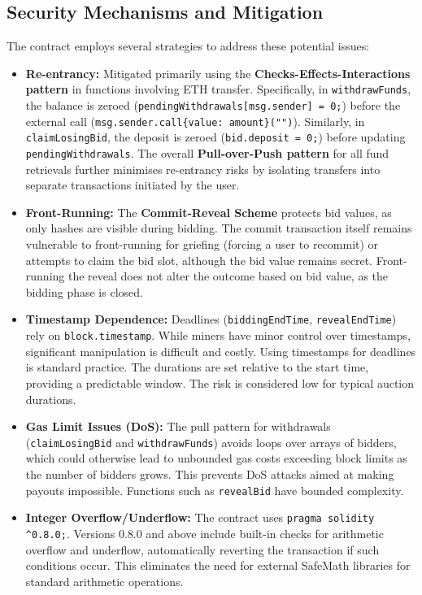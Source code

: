 \documentclass[11pt, a4paper]{article}
\begin{document}
\subsection{Security Mechanisms and Mitigation}
The contract employs several strategies to address these potential issues:
\begin{itemize}
    \item \textbf{Re-entrancy:} Mitigated primarily using the \textbf{Checks-Effects-Interactions pattern} in functions involving ETH transfer. Specifically, in \texttt{withdrawFunds}, the balance is zeroed (\texttt{pendingWithdrawals[msg.sender] = 0;}) before the external call (\texttt{msg.sender.call\newline\{value: amount\}("")}). Similarly, in \texttt{claimLosingBid}, the deposit is zeroed (\texttt{bid.\newline deposit = 0;}) before updating \texttt{pendingWithdrawals}. The overall \textbf{Pull-over-Push pattern} for all fund retrievals further minimises re-entrancy risks by isolating transfers into separate transactions initiated by the user.
    \item \textbf{Front-Running:} The \textbf{Commit-Reveal Scheme} protects bid values, as only hashes are visible during bidding. The commit transaction itself remains vulnerable to front-running for griefing (forcing a user to recommit) or attempts to claim the bid slot, although the bid value remains secret. Front-running the reveal does not alter the outcome based on bid value, as the bidding phase is closed.
    \item \textbf{Timestamp Dependence:} Deadlines (\texttt{biddingEndTime}, \texttt{revealEndTime}) rely on \newline \texttt{block.timestamp}. While miners have minor control over timestamps, significant manipulation is difficult and costly. Using timestamps for deadlines is standard practice. The durations are set relative to the start time, providing a predictable window. The risk is considered low for typical auction durations.
    \item \textbf{Gas Limit Issues (DoS):} The pull pattern for withdrawals (\texttt{claimLosingBid} and \texttt{withdrawFunds}) avoids loops over arrays of bidders, which could otherwise lead to unbounded gas costs exceeding block limits as the number of bidders grows. This prevents DoS attacks aimed at making payouts impossible. Functions such as \texttt{revealBid} have bounded complexity.
    \item \textbf{Integer Overflow/Underflow:} The contract uses \texttt{pragma solidity \^{}0.8.0;}. Versions 0.8.0 and above include built-in checks for arithmetic overflow and underflow, automatically reverting the transaction if such conditions occur. This eliminates the need for external SafeMath libraries for standard arithmetic operations.

\end{itemize}
\end{document}
